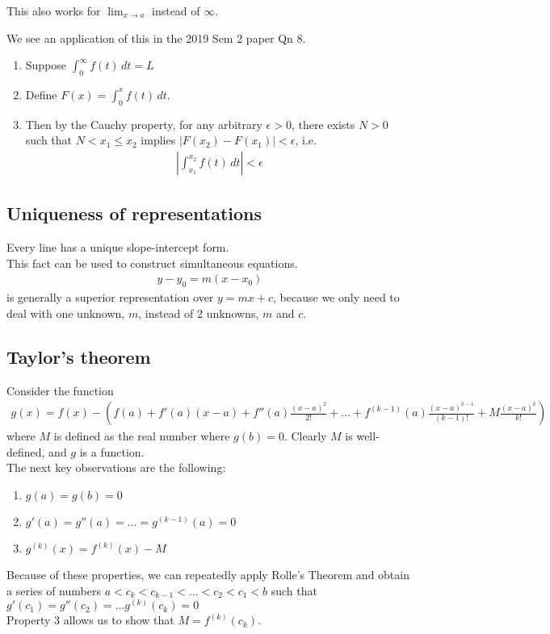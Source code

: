 \documentclass{article}
\begin{document}
This also works for $\lim_{x\rightarrow a}$ instead of $\infty$.

We see an application of this in the 2019 Sem 2 paper Qn 8.
\begin{enumerate}
	\item Suppose $\int_0^\infty f(t)\, dt=L$
	\item Define $F(x)=\int_0^xf(t)\, dt$.
	\item Then by the Cauchy property, for any arbitrary $\epsilon >0$, there exists $N>0$ such that $N<x_1\leq x_2$ implies $|F(x_2)-F(x_1)|<\epsilon$, i.e.
	\begin{align*}
		|\int_{x_1}^{x_2}f(t)\, dt|<\epsilon
	\end{align*}
\end{enumerate}

\subsection{Uniqueness of representations}
Every line has a unique slope-intercept form.\\
This fact can be used to construct simultaneous equations.
\begin{align*}
	y-y_0 = m(x-x_0)
\end{align*}
is generally a superior representation over $y=mx+c$, because we only need to deal with one unknown, $m$, instead of 2 unknowns, $m$ and $c$.

\subsection{Taylor's theorem}
Consider the function
\begin{align*}
	g(x) = f(x) - (f(a) + f'(a)(x-a) + f''(a)\frac{(x-a)^2}{2!} + \dots + f^{(k-1)}(a)\frac{(x-a)^{k-1}}{(k-1)!} + M\frac{(x-a)^{k}}{k!})
\end{align*}
where $M$ is defined as the real number where $g(b)=0$. Clearly $M$ is well-defined, and $g$ is a function.\\
The next key observations are the following:
\begin{enumerate}
	\item $g(a) = g(b) = 0$
	\item $g'(a)=g''(a)=\dots =g^{(k-1)}(a)=0$
	\item $g^{(k)}(x)=f^{(k)}(x)-M$
\end{enumerate}
Because of these properties, we can repeatedly apply Rolle's Theorem and obtain a series of numbers $a<c_k<c_{k-1}<\dots <c_2<c_1<b$ such that $g'(c_1)=g''(c_2)=\dots g^{(k)}(c_{k})=0$\\
Property 3 allows us to show that $M=f^{(k)}(c_k)$.
\end{document}
